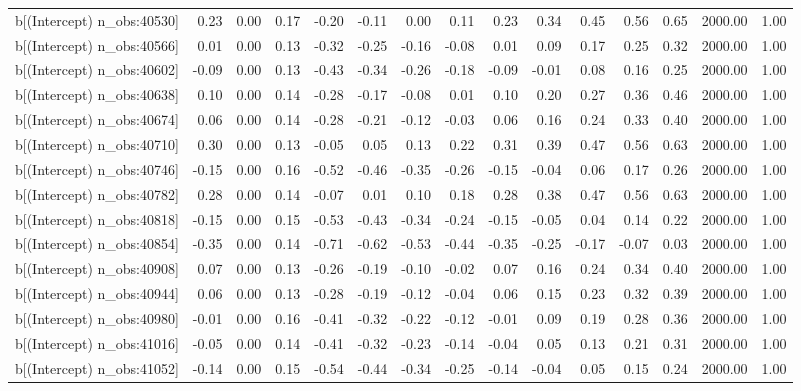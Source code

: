 \begin{table}[ht]
\begin{tabular}{rrrrrrrrrrrrrrr}
  b[(Intercept) n\_obs:40530] & 0.23 & 0.00 & 0.17 & -0.20 & -0.11 & 0.00 & 0.11 & 0.23 & 0.34 & 0.45 & 0.56 & 0.65 & 2000.00 & 1.00 \\ 
  b[(Intercept) n\_obs:40566] & 0.01 & 0.00 & 0.13 & -0.32 & -0.25 & -0.16 & -0.08 & 0.01 & 0.09 & 0.17 & 0.25 & 0.32 & 2000.00 & 1.00 \\ 
  b[(Intercept) n\_obs:40602] & -0.09 & 0.00 & 0.13 & -0.43 & -0.34 & -0.26 & -0.18 & -0.09 & -0.01 & 0.08 & 0.16 & 0.25 & 2000.00 & 1.00 \\ 
  b[(Intercept) n\_obs:40638] & 0.10 & 0.00 & 0.14 & -0.28 & -0.17 & -0.08 & 0.01 & 0.10 & 0.20 & 0.27 & 0.36 & 0.46 & 2000.00 & 1.00 \\ 
  b[(Intercept) n\_obs:40674] & 0.06 & 0.00 & 0.14 & -0.28 & -0.21 & -0.12 & -0.03 & 0.06 & 0.16 & 0.24 & 0.33 & 0.40 & 2000.00 & 1.00 \\ 
  b[(Intercept) n\_obs:40710] & 0.30 & 0.00 & 0.13 & -0.05 & 0.05 & 0.13 & 0.22 & 0.31 & 0.39 & 0.47 & 0.56 & 0.63 & 2000.00 & 1.00 \\ 
  b[(Intercept) n\_obs:40746] & -0.15 & 0.00 & 0.16 & -0.52 & -0.46 & -0.35 & -0.26 & -0.15 & -0.04 & 0.06 & 0.17 & 0.26 & 2000.00 & 1.00 \\ 
  b[(Intercept) n\_obs:40782] & 0.28 & 0.00 & 0.14 & -0.07 & 0.01 & 0.10 & 0.18 & 0.28 & 0.38 & 0.47 & 0.56 & 0.63 & 2000.00 & 1.00 \\ 
  b[(Intercept) n\_obs:40818] & -0.15 & 0.00 & 0.15 & -0.53 & -0.43 & -0.34 & -0.24 & -0.15 & -0.05 & 0.04 & 0.14 & 0.22 & 2000.00 & 1.00 \\ 
  b[(Intercept) n\_obs:40854] & -0.35 & 0.00 & 0.14 & -0.71 & -0.62 & -0.53 & -0.44 & -0.35 & -0.25 & -0.17 & -0.07 & 0.03 & 2000.00 & 1.00 \\ 
  b[(Intercept) n\_obs:40908] & 0.07 & 0.00 & 0.13 & -0.26 & -0.19 & -0.10 & -0.02 & 0.07 & 0.16 & 0.24 & 0.34 & 0.40 & 2000.00 & 1.00 \\ 
  b[(Intercept) n\_obs:40944] & 0.06 & 0.00 & 0.13 & -0.28 & -0.19 & -0.12 & -0.04 & 0.06 & 0.15 & 0.23 & 0.32 & 0.39 & 2000.00 & 1.00 \\ 
  b[(Intercept) n\_obs:40980] & -0.01 & 0.00 & 0.16 & -0.41 & -0.32 & -0.22 & -0.12 & -0.01 & 0.09 & 0.19 & 0.28 & 0.36 & 2000.00 & 1.00 \\ 
  b[(Intercept) n\_obs:41016] & -0.05 & 0.00 & 0.14 & -0.41 & -0.32 & -0.23 & -0.14 & -0.04 & 0.05 & 0.13 & 0.21 & 0.31 & 2000.00 & 1.00 \\ 
  b[(Intercept) n\_obs:41052] & -0.14 & 0.00 & 0.15 & -0.54 & -0.44 & -0.34 & -0.25 & -0.14 & -0.04 & 0.05 & 0.15 & 0.24 & 2000.00 & 1.00 \\ 

\end{tabular}
\end{table}
